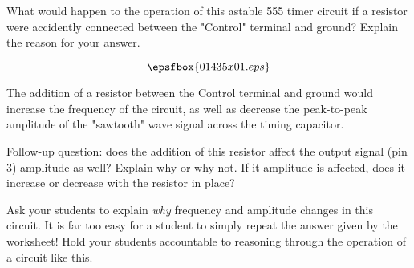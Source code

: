 

What would happen to the operation of this astable 555 timer circuit if a resistor were accidently connected between the "Control" terminal and ground?  Explain the reason for your answer.

$$\epsfbox{01435x01.eps}$$







The addition of a resistor between the Control terminal and ground would increase the frequency of the circuit, as well as decrease the peak-to-peak amplitude of the "sawtooth" wave signal across the timing capacitor.

\vskip 10pt

Follow-up question: does the addition of this resistor affect the output signal (pin 3) amplitude as well?  Explain why or why not.  If it amplitude is affected, does it increase or decrease with the resistor in place?







Ask your students to explain {\it why} frequency and amplitude changes in this circuit.  It is far too easy for a student to simply repeat the answer given by the worksheet!  Hold your students accountable to reasoning through the operation of a circuit like this.




